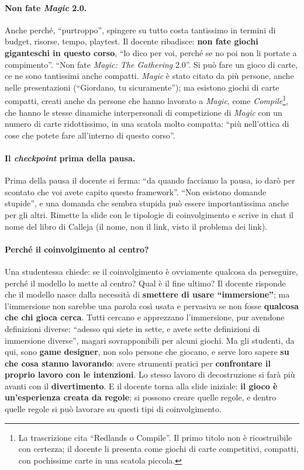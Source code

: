 \paragraph{Non fate \emph{Magic} 2.0.} Anche perché, ``purtroppo'', spingere su
tutto costa tantissimo in termini di budget, risorse, tempo, playtest. Il docente
ribadisce: \textbf{non fate giochi giganteschi in questo corso}, ``lo dico per
voi, perché se no poi non li portate a compimento''. ``Non fate \emph{Magic: The
Gathering} 2.0''. Si può fare un gioco di carte, ce ne sono tantissimi anche
compatti. \emph{Magic} è stato citato da più persone, anche nelle presentazioni
(``Giordano, tu sicuramente''); ma esistono giochi di carte compatti, creati
anche da persone che hanno lavorato a \emph{Magic}, come
\emph{Compile}\footnote{La trascrizione cita ``Redlands o Compile''. Il primo
titolo non è ricostruibile con certezza; il docente li presenta come giochi di
carte competitivi, compatti, con pochissime carte in una scatola piccola.}, che
hanno le stesse dinamiche interpersonali di competizione di \emph{Magic} con un
numero di carte ridottissimo, in una scatola molto compatta: ``più nell'ottica di
cose che potete fare all'interno di questo corso''.

\paragraph{Il \emph{checkpoint} prima della pausa.} Prima della pausa il docente
si ferma: ``da quando facciamo la pausa, io darò per scontato che voi avete capito
questo framework''. ``Non esistono domande stupide'', e una domanda che sembra
stupida può essere importantissima anche per gli altri. Rimette la slide con le
tipologie di coinvolgimento e scrive in chat il nome del libro di Calleja (il
nome, non il link, visto il problema dei link).

\paragraph{Perché il coinvolgimento al centro?} Una studentessa chiede: se il
coinvolgimento è ovviamente qualcosa da perseguire, perché il modello lo mette al
centro? Qual è il fine ultimo? Il docente risponde che il modello nasce dalla
necessità di \textbf{smettere di usare ``immersione''}; ma l'immersione non
sarebbe una parola così usata e pervasiva se non fosse \textbf{qualcosa che chi
gioca cerca}. Tutti cercano e apprezzano l'immersione, pur avendone definizioni
diverse: ``adesso qui siete in sette, e avete sette definizioni di immersione
diverse'', magari sovrapponibili per alcuni giochi. Ma gli studenti, da qui,
sono \textbf{game designer}, non solo persone che giocano, e serve loro sapere
\textbf{su che cosa stanno lavorando}: avere strumenti pratici per
\textbf{confrontare il proprio lavoro con le intenzioni}. Lo stesso lavoro di
decostruzione si farà più avanti con il \textbf{divertimento}. E il docente
torna alla slide iniziale: \textbf{il gioco è un'esperienza creata da regole};
si possono creare quelle regole, e dentro quelle regole si può lavorare su
questi tipi di coinvolgimento.


